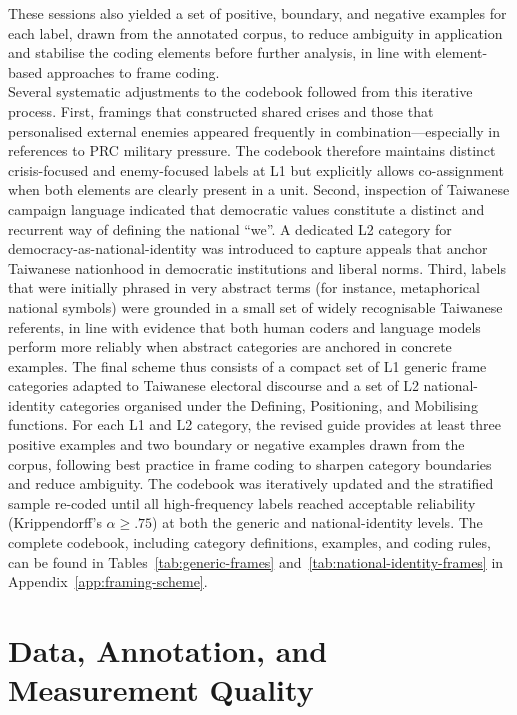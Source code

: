 \documentclass[man,12pt]{apa7}
\begin{document}
These sessions also yielded a set of positive, boundary, and negative examples for each label, drawn from the annotated corpus, to reduce ambiguity in application and stabilise the coding elements before further analysis, in line with element-based approaches to frame coding.\\%
Several systematic adjustments to the codebook followed from this iterative process. 
First, framings that constructed shared crises and those that personalised external enemies appeared frequently in combination—especially in references to PRC military pressure. 
The codebook therefore maintains distinct crisis-focused and enemy-focused labels at L1 but explicitly allows co-assignment when both elements are clearly present in a unit. 
Second, inspection of Taiwanese campaign language indicated that democratic values constitute a distinct and recurrent way of defining the national ``we''. 
A dedicated L2 category for democracy-as-national-identity was introduced to capture appeals that anchor Taiwanese nationhood in democratic institutions and liberal norms. 
Third, labels that were initially phrased in very abstract terms (for instance, metaphorical national symbols) were grounded in a small set of widely recognisable Taiwanese referents, 
in line with evidence that both human coders and language models perform more reliably when abstract categories are anchored in concrete examples. 
The final scheme thus consists of a compact set of L1 generic frame categories adapted to Taiwanese electoral discourse and a set of L2 national-identity categories organised under the Defining, Positioning, and Mobilising functions. 
For each L1 and L2 category, the revised guide provides at least three positive examples and two boundary or negative examples drawn from the corpus, following best practice in frame coding to sharpen category boundaries and reduce ambiguity. 
The codebook was iteratively updated and the stratified sample re-coded until all high-frequency labels reached acceptable reliability (Krippendorff's $\alpha \geq .75$) at both the generic and national-identity levels. 
The complete codebook, including category definitions, examples, and coding rules, can be found in Tables~\ref{tab:generic-frames} and~\ref{tab:national-identity-frames} in Appendix~\ref{app:framing-scheme}.\\%
\section{Data, Annotation, and Measurement Quality}
\end{document}
